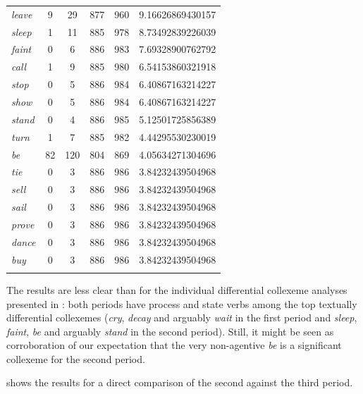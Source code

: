 \begin{table}
{\begin{tabular}[t]{l *{2}{S[table-format=4]} *{2}{S[table-format=4]} S}
\midrule
\textit{leave} & 9 & 29 & 877 & 960 & 9.16626869430157 \\
\textit{sleep} & 1 & 11 & 885 & 978 & 8.73492839226039 \\
\textit{faint} & 0 & 6 & 886 & 983 & 7.69328900762792 \\
\textit{call} & 1 & 9 & 885 & 980 & 6.54153860321918 \\
\textit{stop} & 0 & 5 & 886 & 984 & 6.40867163214227 \\
\textit{show} & 0 & 5 & 886 & 984 & 6.40867163214227 \\
\textit{stand} & 0 & 4 & 886 & 985 & 5.12501725856389 \\
\textit{turn} & 1 & 7 & 885 & 982 & 4.44295530230019 \\
\textit{be} & 82 & 120 & 804 & 869 & 4.05634271304696 \\
\textit{tie} & 0 & 3 & 886 & 986 & 3.84232439504968 \\
\textit{sell} & 0 & 3 & 886 & 986 & 3.84232439504968 \\
\textit{sail} & 0 & 3 & 886 & 986 & 3.84232439504968 \\
\textit{prove} & 0 & 3 & 886 & 986 & 3.84232439504968 \\
\textit{dance} & 0 & 3 & 886 & 986 & 3.84232439504968 \\
\textit{buy} & 0 & 3 & 886 & 986 & 3.84232439504968 \\
\lspbottomrule
\end{tabular}}
\end{table}

The results are less clear than for the individual differential collexeme  analyses presented in : both periods have process  and state  verbs  among the top textually differential collexemes (\textit{cry}, \textit{decay} and arguably \textit{wait} in the first period and \textit{sleep}, \textit{faint}, \textit{be} and arguably \textit{stand} in the second period). Still, it might be seen as corroboration of our expectation that the very non\hyp{}agentive  \textit{be} is a significant collexeme for the second period.

 shows the results for a direct comparison of the second against the third period.

